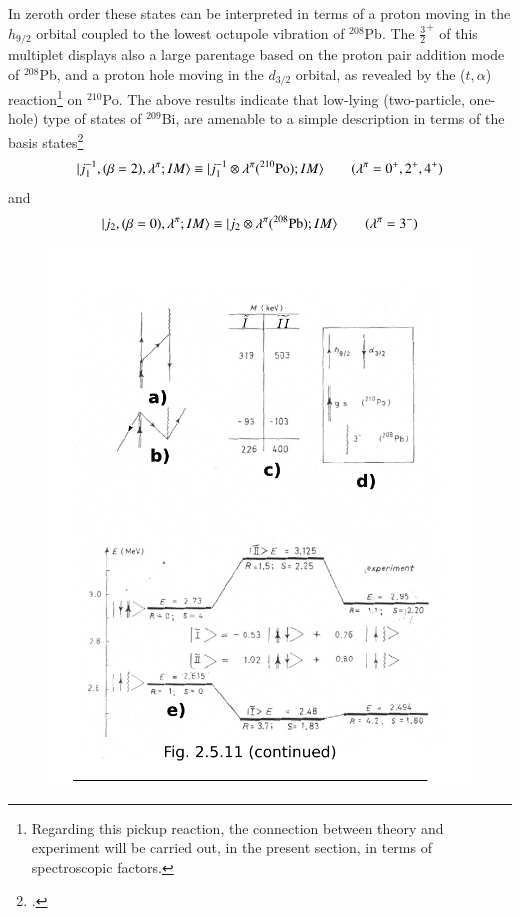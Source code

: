 In zeroth order these states can be interpreted in terms of a proton moving in the $h_{9/2}$ orbital coupled to the lowest octupole vibration of $^{208}$Pb. The $\frac{3}{2}^+$ of this multiplet displays also a large parentage based on the proton pair addition mode of $^{208}$Pb,
and a proton hole moving in the $d_{3/2}$ orbital, as revealed by the ($t,\alpha$) reaction\footnote{Regarding this pickup reaction, the connection between theory and experiment will be carried out, in the present section, in terms of spectroscopic factors.} 
on $^{210}$Po. 
The above results indicate that  low-lying (two-particle, one-hole) type of states 
of $^{209}$Bi, are amenable to a simple description in terms of the basis states\footnote{\cite{Barnes:72}.} 
  \begin{align}\label{eqC1A87} 
   |{j^{-1}_1,(\beta=2),\lambda^{\pi};IM} \rangle\equiv |{j_1^{-1}\otimes \lambda^\pi(^{210}\text{Po});IM} \rangle\qquad(\lambda^{\pi}=0^+,2^+,4^+)
    \end{align} 
and 
  \begin{align}\label{eqC1A88} 
   |{j_2,(\beta=0),\lambda^{\pi};IM} \rangle\equiv |{j_2\otimes \lambda^\pi(^{208}\text{Pb});IM} \rangle\qquad(\lambda^{\pi}=3^-)
  \end{align}
         \begin{figure}
         \centerline {
         \includegraphics*[width=12cm]{introduccion/figs/fig24a}
         }
         \end{figure}
